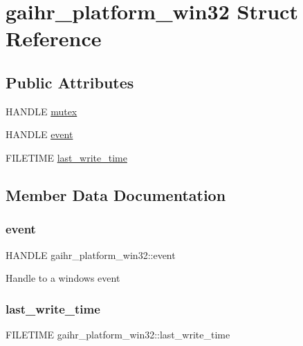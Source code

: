 \hypertarget{structgaihr__platform__win32}{}\section{gaihr\+\_\+platform\+\_\+win32 Struct Reference}
\label{structgaihr__platform__win32}
\subsection*{Public Attributes}
\begin{DoxyCompactItemize}
\item 
H\+A\+N\+D\+LE \hyperlink{structgaihr__platform__win32_a6119861cabb0b6251f23e90033780a82}{mutex}
\item 
H\+A\+N\+D\+LE \hyperlink{structgaihr__platform__win32_a146c8d18d7cc6be7113e1afcb92e6a8f}{event}
\item 
F\+I\+L\+E\+T\+I\+ME \hyperlink{structgaihr__platform__win32_a5070e950e8c5307cf121b4ac4adcb5e1}{last\+\_\+write\+\_\+time}
\end{DoxyCompactItemize}


\subsection{Member Data Documentation}
\mbox{\label{structgaihr__platform__win32_a146c8d18d7cc6be7113e1afcb92e6a8f}} 
\subsubsection{\texorpdfstring{event}{event}}
{\footnotesize\ttfamily H\+A\+N\+D\+LE gaihr\+\_\+platform\+\_\+win32\+::event}

Handle to a windows event \mbox{\label{structgaihr__platform__win32_a5070e950e8c5307cf121b4ac4adcb5e1}} 
\subsubsection{\texorpdfstring{last\+\_\+write\+\_\+time}{last\_write\_time}}
{\footnotesize\ttfamily F\+I\+L\+E\+T\+I\+ME gaihr\+\_\+platform\+\_\+win32\+::last\+\_\+write\+\_\+time}


